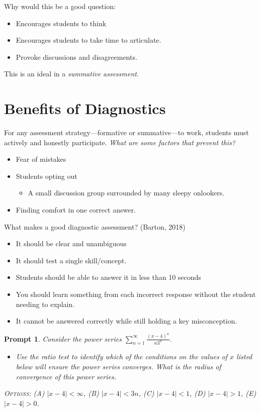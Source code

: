 \documentclass{amsart}
\theoremstyle{theorem}\newtheorem{prompt}{Prompt}
\begin{document}
Why would this be a good question:
\begin{itemize}
    \item Encourages students to think
    \item Encourages students to take time to articulate.
    \item Provoke discussions and disagreements.
\end{itemize}
This is an ideal in a \emph{summative assessment}.

\section{Benefits of Diagnostics}

For any assessment strategy---formative or summative---to work, students must actively and honestly participate. \emph{What are some factors that prevent this?}
\begin{itemize}
    \item Fear of mistakes
    \item Students opting out
    \begin{itemize}
        \item[$\bigstar$] A small discussion group surrounded by many sleepy onlookers.
    \end{itemize}
    \item Finding comfort in one correct answer.
\end{itemize}

What makes a good diagnostic assessment? (Barton, 2018)
\begin{itemize}
    \item It should be clear and unambiguous
    \item It should test a single skill/concept.
    \item Students should be able to answer it in less than 10 seconds
    \item You should learn something from each incorrect response without the student needing to explain.
    \item It cannot be answered correctly while still holding a key misconception.
\end{itemize}

\begin{prompt}
    Consider the power series $\sum_{n = 1}^{\infty} \frac{(x - 4)^n}{n3^n}$.
    \begin{itemize}
        \item[(a)] Use the ratio test to identify which of the conditions on the values of $x$ listed below will ensure the power series converges. What is the radius of convergence of this power series.
    \end{itemize}
    \textsc{Options:} (A) $|x - 4| < \infty$, (B) $|x - 4| < 3n$, (C) $|x - 4| < 1$, (D) $|x - 4| > 1$, (E) $|x - 4| > 0$.
\end{prompt}
\end{document}
